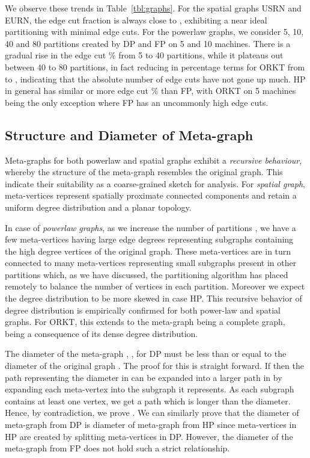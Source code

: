 \documentclass[10pt,conference, compsocconf]{IEEEtran}
\begin{document}
We observe these trends in Table~\ref{tbl:graphs}. For the spatial graphs USRN and EURN, the edge cut fraction is always close to , exhibiting a near ideal partitioning with minimal edge cuts. For the powerlaw graphs, we consider 5, 10, 40 and 80 partitions created by DP and FP on 5 and 10 machines. There is a gradual rise in the edge cut \% from 5 to 40 partitions, while it plateaus out between 40 to 80 partitions, in fact reducing in percentage terms for ORKT from  to , indicating that the absolute number of edge cuts have not gone up much. HP in general has similar or more edge cut \% than FP, with ORKT on 5 machines being the only exception where FP has an uncommonly high  edge cuts.








\subsection{Structure and Diameter of Meta-graph}
Meta-graphs for both powerlaw and spatial graphs exhibit a \emph{recursive behaviour}, whereby the structure of the meta-graph resembles the original graph. This indicate their suitability as a coarse-grained sketch for analysis. For \emph{spatial graph}, meta-vertices represent spatially proximate connected components and retain a uniform degree distribution and a planar topology.

In case of \emph{powerlaw graphs}, as we increase the number of partitions , we have a few meta-vertices having large edge degrees representing subgraphs containing the high degree vertices of the original graph. These meta-vertices are in turn connected to many meta-vertices representing small subgraphs present in other partitions which, as we have discussed, the partitioning algorithm has placed remotely to balance the number of vertices in each partition. Moreover we expect the degree distribution to be more skewed in case HP. This recursive behavior of degree distribution is empirically confirmed for both power-law and spatial graphs. For ORKT, this extends to the meta-graph being a complete graph, being a consequence of its dense degree distribution. 

The diameter of the meta-graph , , for DP must be less than or equal to the diameter of the original graph . The proof for this is straight forward. If  then the path representing the diameter in  can be expanded into a larger path in  by expanding each meta-vertex  into the subgraph it represents. As each subgraph contains at least one vertex, we get a path which is longer than the diameter. Hence, by contradiction, we prove . We can similarly prove that the diameter of meta-graph from DP is  diameter of meta-graph from HP since meta-vertices in HP are created by splitting meta-vertices in DP. However, the diameter of the meta-graph from FP does not hold such a strict relationship.
\end{document}
